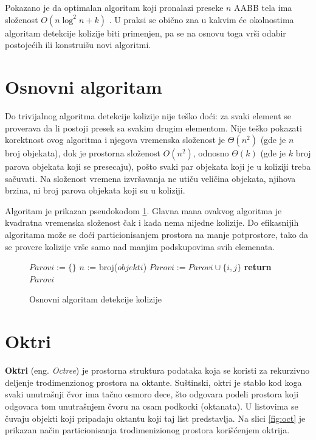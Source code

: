 \documentclass[12pt,oneside]{memoir}
\begin{document}
Pokazano je da optimalan algoritam koji pronalazi preseke $n$ AABB tela ima složenost 
$O(n \log^2 n + k)$ \cite{glavna1}. 
U praksi se obično zna u kakvim će okolnostima algoritam detekcije kolizije biti primenjen, pa 
se na osnovu toga vrši odabir postojećih ili konstruišu novi algoritmi.

\section{Osnovni algoritam}
\label{subsec:triv}

Do trivijalnog algoritma detekcije kolizije nije teško doći: za svaki element se proverava da li postoji presek sa svakim drugim elementom.
Nije teško pokazati korektnost ovog algoritma i njegova vremenska složenost je $\Theta (n^2) $ (gde je $n$ broj objekata), dok je prostorna složenost
$O(n^2)$, odnosno $\Theta(k)$ (gde je $k$ broj parova objekata koji se presecaju), pošto svaki par objekata koji je u koliziji treba sačuvati.
Na složenost vremena izvršavanja ne utiču veličina objekata, njihova brzina, ni broj parova objekata koji su u koliziji.

Algoritam je prikazan pseudokodom \ref{alg:triv}.
Glavna mana ovakvog algoritma je kvadratna vremenska složenost čak i kada nema nijedne kolizije.
Do efikasnijih algoritama može se doći particionisanjem prostora na manje potprostore, tako da
se provere kolizije vrše samo nad manjim podskupovima svih elemenata.

\begin{figure}[!h]
    \label{alg:triv}
	\begin{algorithmic}[1]
		\State $Parovi := \{ \}$
		\State $n$ := broj($objekti$)
				\State $Parovi:=Parovi \cup \{i, j\}$
			\EndIf		
		\EndFor
		\EndFor
		\State \textbf{return} $Parovi$
		\EndProcedure
    \end{algorithmic}
\caption{Osnovni algoritam detekcije kolizije}
\end{figure}

\section{Oktri}
\label{subsec:octree}

\textbf{Oktri} (eng. {\em Octree}) je prostorna struktura podataka koja se koristi za rekurzivno deljenje trodimenzionog prostora na oktante.
Suštinski, oktri je stablo kod koga svaki unutrašnji čvor ima tačno osmoro dece,
što odgovara podeli prostora koji odgovara tom unutrašnjem čvoru na osam podkocki (oktanata).
U listovima se čuvaju objekti koji pripadaju oktantu koji taj list predstavlja.
Na slici \ref{fig:oct} je prikazan način particionisanja trodimenizionog prostora korišćenjem oktrija.
\end{document}
